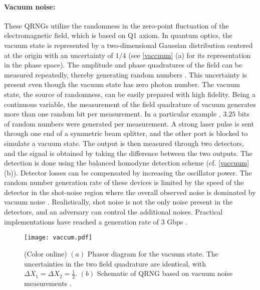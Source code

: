 \documentclass[]{interact}
\theoremstyle{plain}%
\theoremstyle{definition}
\theoremstyle{remark}
\begin{document}
\paragraph{Vacuum noise:} These QRNGs utilize the randomness in the zero-point fluctuation of the electromagnetic field, which is based on Q1 axiom. 
In quantum optics, the vacuum state is represented by a
two-dimensional Gaussian distribution centered at the origin with
an uncertainty of $1/4$ (see \autoref{vaccuum} (a) for its representation in the phase space). The amplitude and phase quadratures of the field can be measured repeatedly, thereby generating random numbers \cite{shen2010practical}. This uncertainty is present even though the vacuum state has zero photon number.
The vacuum state, the source of randomness, can be easily prepared with high fidelity. Being a
continuous variable, the measurement of the field quadrature of vacuum generates more than one random bit per measurement. In a particular example \cite{Gabriel2010}, $3.25$ bits
of random numbers were generated per measurement. A strong laser pulse is sent through one end of a symmetric beam splitter, and the other port is blocked to simulate a vacuum state. The output is then measured through two detectors, and the signal is obtained by taking the difference between the two outputs. The detection is done using the balanced homodyne detection scheme (cf. \autoref{vaccuum} (b)). Detector losses can be compensated by increasing the oscillator power. The random number generation rate of these devices is limited by the speed of the detector in the shot-noise region where the overall observed noise is dominated by vacuum noise \cite{PhysRevLett.59.278}. Realistically, shot noise is not the only noise present in the detectors, and an adversary can control the additional noises. Practical implementations have reached a generation rate of $3$ Gbps \cite{symul2011real}.\\

\begin{figure}
    \centering
    \texttt{[image: vaccum.pdf]}
    \caption{ (Color online) $(a)$ Phasor diagram for the vacuum state. The uncertainties in the two field quadrature are identical,
with $ \Delta X_1 =  \Delta X_2 = \frac{1}{2}.$  $(b)$ Schematic of QRNG based on vacuum noise measurements \cite{ma2016quantum}.}
    \label{vaccuum}
\end{figure}
\end{document}
